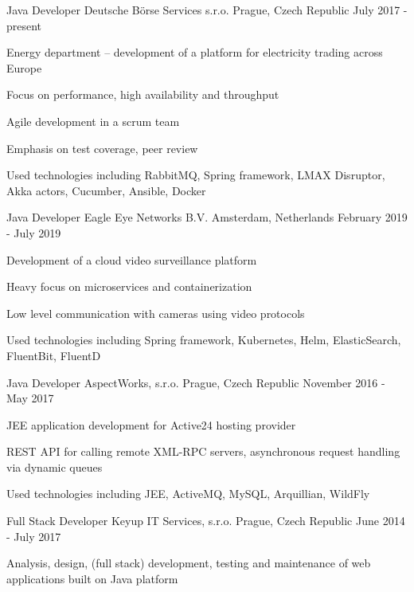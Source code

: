 \begin{cventries}
  \cventry
	{Java Developer}
	{Deutsche Börse Services s.r.o.}
	{Prague, Czech Republic}
	{July 2017 - present}
	{
	  \begin{cvitems}
	    \item {Energy department -- development of a platform for electricity trading across Europe}
	    \item {Focus on performance, high availability and throughput}
	    \item {Agile development in a scrum team}
	    \item {Emphasis on test coverage, peer review}
	    \item {Used technologies including RabbitMQ, Spring framework, LMAX Disruptor, Akka actors, Cucumber, Ansible, Docker}
	  \end{cvitems}
	}
  \cventry
	{Java Developer}
	{Eagle Eye Networks B.V.}
	{Amsterdam, Netherlands}
	{February 2019 - July 2019}
	{
	  \begin{cvitems}
	    \item {Development of a cloud video surveillance platform}
	    \item {Heavy focus on microservices and containerization}
	    \item {Low level communication with cameras using video protocols}
	    \item {Used technologies including Spring framework, Kubernetes, Helm, ElasticSearch, FluentBit, FluentD}
	  \end{cvitems}
	}
  \cventry
    {Java Developer}
    {AspectWorks, s.r.o.}
    {Prague, Czech Republic}
    {November 2016 - May 2017}
    {
      \begin{cvitems}
        \item {JEE application development for Active24 hosting provider}
        \item {REST API for calling remote XML-RPC servers, asynchronous request handling via dynamic queues}
        \item {Used technologies including JEE, ActiveMQ, MySQL, Arquillian, WildFly}
      \end{cvitems}
    }
  \cventry
    {Full Stack Developer}
    {Keyup IT Services, s.r.o.}
    {Prague, Czech Republic}
    {June 2014 - July 2017}
    {
      \begin{cvitems}
        \item {Analysis, design, (full stack) development, testing and maintenance of web applications built on Java platform}

\end{cvitems}}
\end{cventries}

